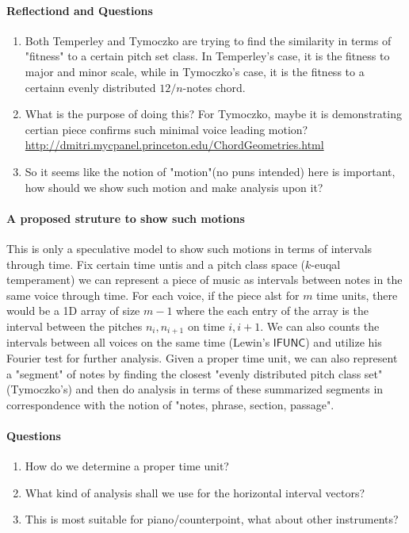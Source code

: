 \documentclass[12pt]{report}
\begin{document}
\paragraph*{Reflectiond and Questions}
\begin{enumerate}
    \item Both Temperley and Tymoczko are trying to find the 
    similarity in terms of "fitness" to a certain pitch set class.
    In Temperley's case, it is the fitness to major and minor scale,
    while in Tymoczko's case, it is the fitness to a certainn evenly distributed
    $12/n$-notes chord. 
    \item What is the purpose of doing this? For Tymoczko, maybe it is
    demonstrating certian piece confirms such minimal voice leading motion?
    \\\url{http://dmitri.mycpanel.princeton.edu/ChordGeometries.html}
    \item So it seems like the notion of "motion"(no puns intended) here is
    important, how should we show such motion and make analysis upon it?
\end{enumerate}
\paragraph*{A proposed struture to show such motions}
This is only a speculative model to show such motions in terms of
intervals through time. Fix certain time untis and a pitch class space
($k$-euqal temperament) we can represent a piece of music as intervals
between notes in the same voice through time. For each voice,
if the piece alst for $m$ time units, there would be a 
1D array of size $m-1$ where the each entry of the array is the
interval between the pitches $n_i, n_{i+1}$ on time $i, i+1$. We 
can also counts the intervals between all voices on the same time
(Lewin's $\mathsf{IFUNC}$) and utilize his Fourier test for further
analysis. Given a proper time unit, we can also represent a "segment"
of notes by finding the closest "evenly distributed pitch class set"(Tymoczko's)
and then do analysis in terms of these summarized segments in correspondence
with the notion of "notes, phrase, section, passage".
\paragraph*{Questions}
\begin{enumerate}
    \item How do we determine a proper time unit?
    \item What kind of analysis shall we use for the horizontal interval vectors?
    \item This is most suitable for piano/counterpoint, what about other instruments?
\end{enumerate}
\end{document}

